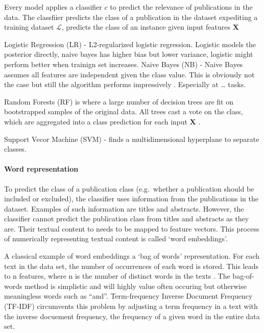 \documentclass[
]{article}
\begin{document}
Every model applies a classifier \(c\) to predict the relevance of
publications in the data. The classfiier predicts the class of a
publication in the dataset expediting a training dataset
\(\mathcal{L}\), predicts the class of an instance given input features
\(\mathbf{X}\)

Logistic Regression (LR) - L2-regularized logistic regression. Logistic
models the posterior directly, naive bayes has higher bias but lower
variance, logistic might perform better when trainign set increases.
\autocite{Ng2002} Naive Bayes (NB) - Naive Bayes assumes all features
are independent given the class value. This is obviously not the case
but still the algorithm performs impressively \autocite{Zhang2004}.
Especially at \ldots{} tasks.

Random Forests (RF) is where a large number of decision trees are fit on
bootstrapped samples of the original data. All trees cast a vote on the
class, which are aggregated into a class prediction for each input
\(\mathbf{X}\) \autocite{Breiman2001}.

Support Vecor Machine (SVM) - finds a multidimensional hyperplane to
separate classes. \autocite{Tong2001}

\hypertarget{word-representation}{%
\paragraph{Word representation}\label{word-representation}}

To predict the class of a publication class (e.g.~whether a publication
should be included or excluded), the classifier uses information from
the publications in the dataset. Examples of such information are titles
and abstracts. However, the classifier cannot predict the publication
class from titles and abstracts as they are. Their textual content to
needs to be mapped to feature vectors. This process of numerically
representing textual content is called `word embeddings'.

A classical example of word embeddings a `bag of words' representation.
For each text in the data set, the number of occurrences of each word is
stored. This leads to n features, where n is the number of distinct
words in the texts \autocite{scikit-learn}. The bag-of-words method is
simplistic and will highly value often occuring but otherwise
meaningless words such as ``and''. Term-frequency Inverse Document
Frequency (TF-IDF) \autocite{Ramos2003} circumvents this problem by
adjusting a term frequency in a text with the inverse docuement
frequency, the frequency of a given word in the entire data set.
\end{document}
